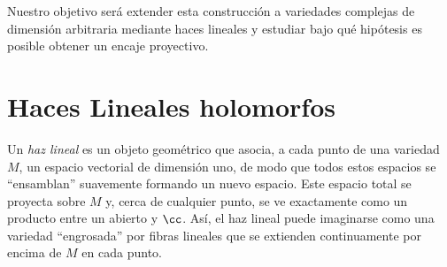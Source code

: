 	Nuestro objetivo será extender esta construcción a variedades complejas de dimensión arbitraria mediante haces lineales y estudiar bajo qué hipótesis es posible obtener un encaje proyectivo.
	
\section{Haces Lineales holomorfos}

	
    Un \textit{haz lineal} es un objeto geométrico que asocia, a cada punto de una variedad $M$, un espacio vectorial de dimensión uno, de modo que todos estos espacios se \enquote{ensamblan} suavemente formando un nuevo espacio. Este espacio total se proyecta sobre $M$ y, cerca de cualquier punto, se ve exactamente como un producto entre un abierto y $\cc$. Así, el haz lineal puede imaginarse como una variedad \enquote{engrosada} por fibras lineales que se extienden continuamente por encima de $M$ en cada punto.

